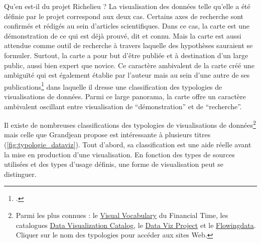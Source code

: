 Qu'en est-il du projet Richelieu ? La visualisation des données telle qu'elle a été définie par le projet correspond aux deux cas. Certains axes de recherche sont confirmés et rédigés au sein d'articles scientifiques. Dans ce cas, la carte est une démonstration de ce qui est déjà prouvé, dit et connu. Mais la carte est aussi attendue comme outil de recherche à travers laquelle des hypothèses sauraient se formuler. Surtout, la carte a pour but d'être publiée et à destination d'un large public, aussi bien expert que novice. Ce caractère ambivalent de la carte créé une ambiguïté qui est également établie par l'auteur mais au sein d'une autre de ses publications\footcite{GRANDJEANvisualisation2022} dans laquelle il dresse une classification des typologies de visualisations de données. Parmi ce large panorama, la carte offre un caractère ambivalent oscillant entre visualisation de \enquote{démonstration} et de \enquote{recherche}. 

Il existe de nombreuses classifications des typologies de visualisations de données\footnote{Parmi les plus connues : le \href{https://github.com/Financial-Times/chart-doctor/blob/main/visual-vocabulary/poster.png}{Visual Vocabulary} du Financial Time, les catalogues \href{https://datavizcatalogue.com/FR/}{Data Visualization Catalog}, le \href{https://datavizproject.com/}{Data Viz Project} et le \href{https://flowingdata.com/chart-types/}{Flowingdata}. Cliquer sur le nom des typologies pour accéder aux sites Web.}  mais celle que Grandjean propose est intéressante à plusieurs titres (\ref{fig:typologie_dataviz}). Tout d'abord, sa classification est une aide réelle avant la mise en production d'une visualisation. En fonction des types de sources utilisées et des types d'usage définis, une forme de visualisation peut se distinguer. 


